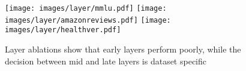 \begin{figure}[h]
    \centering
    \texttt{[image: images/layer/mmlu.pdf]} \texttt{[image: images/layer/amazonreviews.pdf]}
    \texttt{[image: images/layer/healthver.pdf]}
    \caption{Layer ablations show that early layers perform poorly, while the decision between mid and late layers is dataset specific}
    \label{fig:layer}
\end{figure}